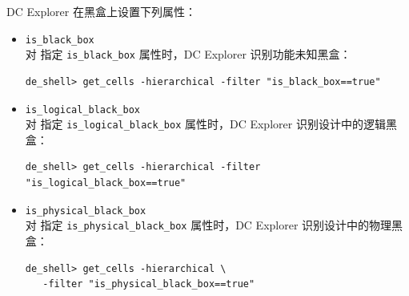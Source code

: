 DC Explorer 在黑盒上设置下列属性：
\begin{itemize}
  \item \texttt{is\_black\_box}\\
        对  指定 \texttt{is\_black\_box} 属性时，DC Explorer 识别功能未知黑盒：
\begin{lstlisting}
de_shell> get_cells -hierarchical -filter "is_black_box==true"
\end{lstlisting}

  \item \texttt{is\_logical\_black\_box}\\
        对  指定 \texttt{is\_logical\_black\_box} 属性时，DC Explorer 识别设计中的逻辑黑盒：
\begin{lstlisting}
de_shell> get_cells -hierarchical -filter "is_logical_black_box==true"
\end{lstlisting}

  \item \texttt{is\_physical\_black\_box}\\
        对  指定 \texttt{is\_physical\_black\_box} 属性时，DC Explorer 识别设计中的物理黑盒：
\begin{lstlisting}
de_shell> get_cells -hierarchical \
   -filter "is_physical_black_box==true"
\end{lstlisting}
\end{itemize}
